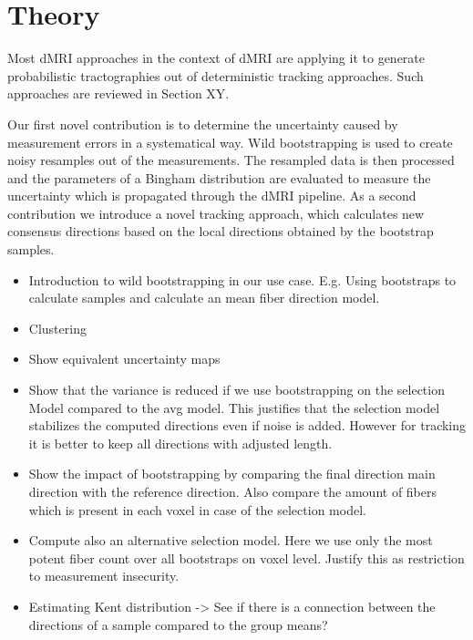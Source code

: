 \section{Theory}
Most dMRI approaches in the context of dMRI are applying it to generate
probabilistic tractographies out of deterministic tracking approaches. Such
approaches are reviewed in Section XY. 

Our first novel contribution is to determine the uncertainty caused by
measurement errors in a systematical way. Wild bootstrapping is used to create
noisy resamples out of the measurements. The resampled data is then processed
and the parameters of a Bingham distribution are evaluated to measure the
uncertainty which is propagated through the dMRI pipeline. As a second
contribution we introduce a novel tracking approach, which calculates new
consensus directions based on the local directions obtained by the bootstrap
samples.  

\begin{itemize}
	\item Introduction to wild bootstrapping in our use case. E.g. Using
		bootstraps to calculate samples and calculate an mean fiber
		direction model. 
	\item Clustering 
	\item Show equivalent uncertainty maps
	\item Show that the variance is reduced if we use bootstrapping on the
		selection Model compared to the avg model. This justifies that
		the selection model stabilizes the computed directions even if
		noise is added. However for tracking it is better to keep all
		directions with adjusted length.
	\item Show the impact of bootstrapping by comparing the final direction
		main direction with the reference direction. Also compare the
		amount of fibers which is present in each voxel in case of the
		selection model.
	\item Compute also an alternative selection model. Here we use only the
		most potent fiber count over all bootstraps on voxel level.
		Justify this as restriction to measurement insecurity.
	\item Estimating Kent distribution -> See if there is a connection
		between the directions of a sample compared to the group means? 
\end{itemize}
